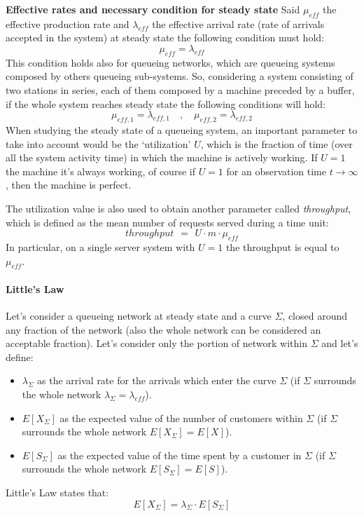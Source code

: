 \documentclass[12pt,a4paper]{article}
\begin{document}
\bigskip\noindent
\textbf{Effective rates and necessary condition for steady state }
Said $\mu_{eff}$ the effective production rate and $\lambda_{eff}$ the effective arrival rate (rate of arrivals accepted in the system) at steady state the following condition must hold:
$$
\mu_{eff}=\lambda_{eff}
$$
This condition holds also for queueing networks, which are queueing systems composed by others queueing sub-systems. So, considering a system consisting of two stations in series, each of them composed by a machine preceded by a buffer, if the whole system reaches steady state the following conditions will hold:
$$
\mu_{eff,1}=\lambda_{eff,1}
\quad
,
\quad
\mu_{eff,2}=\lambda_{eff,2}
$$
When studying the steady state of a queueing system, an important parameter to take into account would be the `utilization' $U$, which is the fraction of time (over all the system activity time) in which the machine is actively working. If $U=1$ the machine it's always working, of course if $U=1$ for an observation time $t\rightarrow \infty$, then the machine is perfect. 

\bigskip\noindent
The utilization value is also used to obtain another parameter called \emph{throughput}, which is defined as the mean number of requests served during a time unit:
$$
throughput\hspace{5pt}=\hspace{5pt}U\cdot m\cdot \mu_{eff}
$$
In particular, on a single server system with $U=1$ the throughput is equal to $\mu_{eff}$.
\newpage

\paragraph{Little's Law}
Let's consider a queueing network at steady state and a curve $\Sigma$, closed around any fraction of the network (also the whole network can be considered an acceptable fraction). Let's consider only the portion of network within $\Sigma$ and let's define:
\begin{itemize}
\item $\lambda_{\Sigma}$ as the arrival rate for the arrivals which enter the curve $\Sigma$ (if $\Sigma$ surrounds the whole network $\lambda_{\Sigma}=\lambda_{eff}$).
\item $E[X_{\Sigma}]$ as the expected value of the number of customers within $\Sigma$ (if $\Sigma$ surrounds the whole network $E[X_{\Sigma}]=E[X]$).
\item $E[S_{\Sigma}]$ as the expected value of the time spent by a customer in $\Sigma$ (if $\Sigma$ surrounds the whole network $E[S_{\Sigma}]=E[S]$).
\end{itemize}
Little's Law states that:
\begin{equation*}
E[X_{\Sigma}]=\lambda_{\Sigma}\cdot E[S_{\Sigma}]
\end{equation*}
\end{document}
